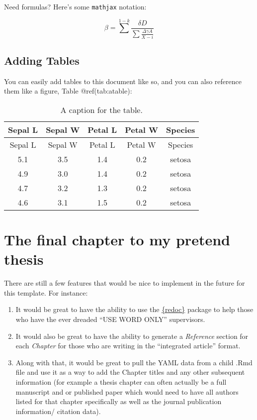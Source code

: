 \documentclass[
]{article}
\begin{document}
Need formulas? Here's some \texttt{mathjax} notation:

\[
\beta = \sum^{1 - k}\frac{\delta D}{\sum\frac{\Delta \gamma A}{X-i}}
\]

\hypertarget{adding-tables}{%
\subsection{Adding Tables}\label{adding-tables}}

You can easily add tables to this document like so, and you can also
reference them like a figure, Table @ref(tab:atable):

\begin{longtable}[]{@{}ccccc@{}}
\caption{A caption for the table.}\tabularnewline
\toprule
Sepal L & Sepal W & Petal L & Petal W & Species \\
\midrule
\endfirsthead
\toprule
Sepal L & Sepal W & Petal L & Petal W & Species \\
\midrule
\endhead
5.1 & 3.5 & 1.4 & 0.2 & setosa \\
4.9 & 3.0 & 1.4 & 0.2 & setosa \\
4.7 & 3.2 & 1.3 & 0.2 & setosa \\
4.6 & 3.1 & 1.5 & 0.2 & setosa \\
\bottomrule
\end{longtable}

\hypertarget{the-final-chapter-to-my-pretend-thesis}{%
\section{The final chapter to my pretend
thesis}\label{the-final-chapter-to-my-pretend-thesis}}

There are still a few features that would be nice to implement in the
future for this template. For instance:

\begin{enumerate}
\def\labelenumi{\arabic{enumi}.}
\item
  It would be great to have the ability to use the
  \href{https://github.com/noamross/redoc}{\{redoc\}} package to help
  those who have the ever dreaded ``USE WORD ONLY'' supervisors.
\item
  It would also be great to have the ability to generate a
  \emph{Reference} section for each \emph{Chapter} for those who are
  writing in the ``integrated article'' format.
\item
  Along with that, it would be great to pull the YAML data from a child
  .Rmd file and use it as a way to add the Chapter titles and any other
  subsequent information (for example a thesis chapter can often
  actually be a full manuscript and or published paper which would need
  to have all authors listed for that chapter specifically as well as
  the journal publication information/ citation data).
\end{enumerate}
\end{document}
